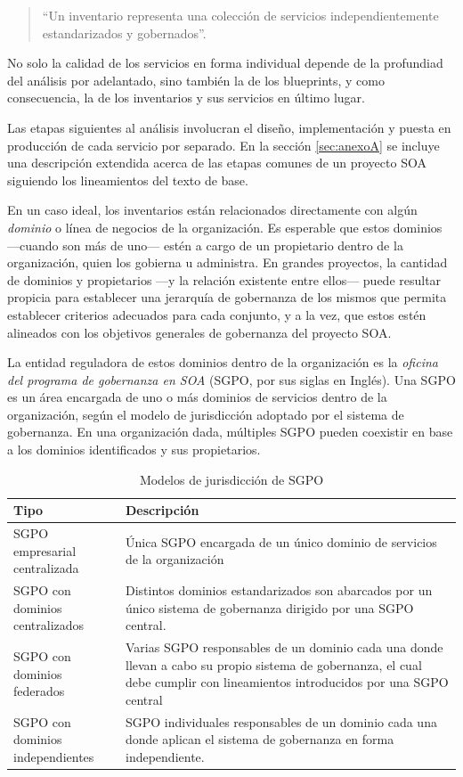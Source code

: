 \documentclass[11pt]{article}
\begin{document}
		\begin{quote}
			``Un inventario representa una colección de servicios independientemente estandarizados y gobernados''. \cite{Erl:2011:SGG:1983453}
		\end{quote}

		No solo la calidad de los servicios en forma individual depende de la profundiad del análisis por adelantado, sino también la de los blueprints, y como consecuencia, la de los inventarios y sus servicios en último lugar.

		Las etapas siguientes al análisis involucran el diseño, implementación y puesta en producción de cada servicio por separado. En la sección \ref{sec:anexoA} se incluye una descripción extendida acerca de las etapas comunes de un proyecto SOA siguiendo los lineamientos del texto de base.

		En un caso ideal, los inventarios están relacionados directamente con algún \emph{dominio} o línea de negocios de la organización. Es esperable que estos dominios —cuando son más de uno— estén a cargo de un propietario dentro de la organización, quien los gobierna u administra. En grandes proyectos, la cantidad de dominios y propietarios —y la relación existente entre ellos— puede resultar propicia para establecer una jerarquía de gobernanza de los mismos que permita establecer criterios adecuados para cada conjunto, y a la vez, que estos estén alineados con los objetivos generales de gobernanza del proyecto SOA.

		La entidad reguladora de estos dominios dentro de la organización es la \emph{oficina del programa de gobernanza en SOA} (SGPO, por sus siglas en Inglés). Una SGPO es un área encargada de uno o más dominios de servicios dentro de la organización, según el modelo de jurisdicción adoptado por el sistema de gobernanza. En una organización dada, múltiples SGPO pueden coexistir en base a los dominios identificados y sus propietarios.

		\begin{table}[h]
			\begin{tabular}{p{0.25\linewidth} | p{0.75\linewidth}}
				\textbf{Tipo} & \textbf{Descripción} \\
				\hline
				SGPO empresarial centralizada & Única SGPO encargada de un único dominio de servicios de la organización\\
				\hline
				SGPO con dominios centralizados & Distintos dominios estandarizados son abarcados por un único sistema de gobernanza dirigido por una SGPO central.\\
				\hline
				SGPO con dominios federados & Varias SGPO responsables de un dominio cada una donde llevan a cabo su propio sistema de gobernanza, el cual debe cumplir con lineamientos introducidos por una SGPO central\\
				\hline
				SGPO con dominios independientes & SGPO individuales responsables de un dominio cada una donde aplican el sistema de gobernanza en forma independiente.\\
				\hline
			\end{tabular}
			\caption{Modelos de jurisdicción de SGPO}
			\label{tabla:modelos_sgpo}
		\end{table}
\end{document}
